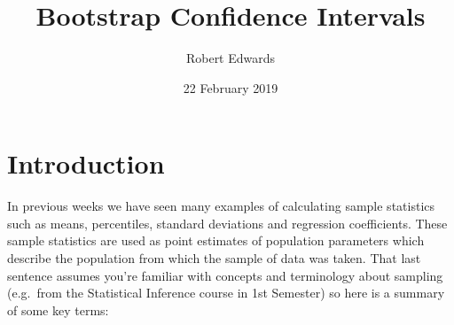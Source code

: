 \documentclass[]{article}
\title{Bootstrap Confidence Intervals}
\author{Robert Edwards}
\date{22 February 2019}
\begin{document}
\maketitle

\section{Introduction}\label{sec:Intro}

In previous weeks we have seen many examples of calculating sample
statistics such as means, percentiles, standard deviations and
regression coefficients. These sample statistics are used as point
estimates of population parameters which describe the population from
which the sample of data was taken. That last sentence assumes you're
familiar with concepts and terminology about sampling (e.g.~from the
Statistical Inference course in 1st Semester) so here is a summary of
some key terms:
\end{document}
